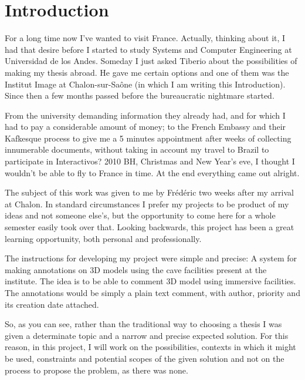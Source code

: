 %

\chapter{Introduction}
For a long time now I've wanted to visit France. Actually, thinking about it, I had that desire before I started to study Systems and Computer Engineering at Universidad de los Andes. Someday I just asked Tiberio about the possibilities of making my thesis abroad. He gave me certain options and one of them was the Institut Image at Chalon-sur-Saône (in which I am writing this Introduction). Since then a few months passed before the bureaucratic nightmare started. 

From the university demanding information they already had, and for which I had to pay a considerable amount of money; to the French Embassy and their Kafkesque process to give me a 5 minutes appointment after weeks of collecting innumerable documents, without taking in account my travel to Brazil to participate in Interactivos? 2010 BH, Christmas and New Year's eve, I thought I wouldn't be able to fly to France in time.  At the end everything came out alright.

The subject of this work was given to me by Frédéric two weeks after my arrival at Chalon. In standard circumstances I prefer my projects to be product of my ideas and not someone else's, but the opportunity to come here for a whole semester easily took over that. Looking backwards, this project has been a great learning opportunity, both personal and professionally.


The instructions for developing my project were simple and precise: A system for making annotations on 3D models using the cave facilities present at the institute. The idea is to be able to comment 3D model using immersive facilities. The annotations would be simply a plain text comment, with author, priority and its creation date attached. 

So, as you can see, rather than the traditional way to choosing a thesis I was given a determinate topic and a narrow and precise expected solution. For this reason, in this project, I will work on the possibilities, contexts in which it might be used, constraints and potential scopes of the given solution and not on the process to propose the problem, as there was none.

